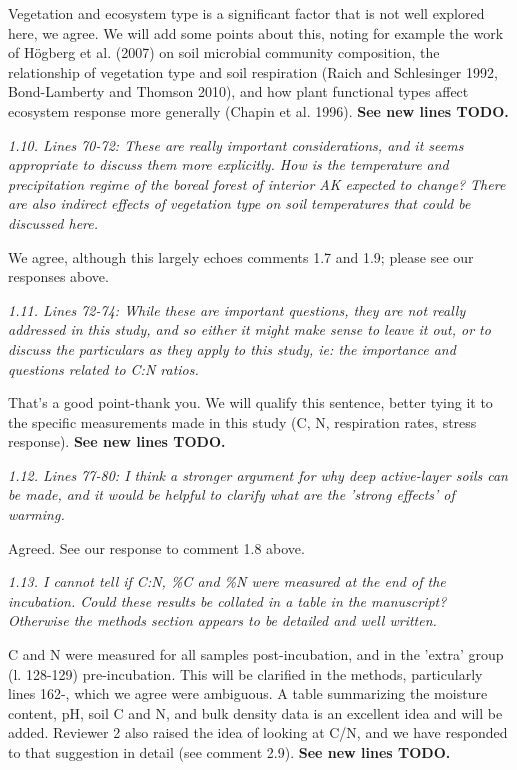 \documentclass[11pt, oneside]{article}
\begin{document}
Vegetation and ecosystem type is a significant factor that is not well explored here, we agree. We will add some points about this, noting for example the work of Högberg et al. (2007) on soil microbial community composition, the relationship of vegetation type and soil respiration (Raich and Schlesinger 1992, Bond-Lamberty and Thomson 2010), and how plant functional types affect ecosystem response more generally (Chapin et al. 1996). {\bf See new lines TODO.}

\medskip
{\it 1.10. Lines 70-72: These are really important considerations, and it seems appropriate to discuss them more explicitly. How is the temperature and precipitation regime of the boreal forest of interior AK expected to change? There are also indirect effects of vegetation type on soil temperatures that could be discussed here. }

We agree, although this largely echoes comments 1.7 and 1.9; please see our responses above.

\medskip
{\it 1.11. Lines 72-74: While these are important questions, they are not really addressed in this study, and so either it might make sense to leave it out, or to discuss the particulars as they apply to this study, ie: the importance and questions related to C:N ratios. }

That's a good point-thank you. We will qualify this sentence, better tying it to the specific measurements made in this study (C, N, respiration rates, stress response). {\bf See new lines TODO.}

\medskip
{\it 1.12. Lines 77-80: I think a stronger argument for why deep active-layer soils can be made, and it would be helpful to clarify what are the 'strong effects' of warming. }

Agreed. See our response to comment 1.8 above.

\medskip
{\it 1.13. I cannot tell if C:N, \%C and \%N were measured at the end of the incubation. Could these results be collated in a table in the manuscript? Otherwise the methods section appears to be detailed and well written. }

C and N were measured for all samples post-incubation, and in the 'extra' group (l. 128-129) pre-incubation. This will be clarified in the methods, particularly lines 162-, which we agree were ambiguous. A table summarizing the moisture content, pH, soil C and N, and bulk density data is an excellent idea and will be added. Reviewer 2 also raised the idea of looking at C/N, and we have responded to that suggestion in detail (see comment 2.9). {\bf See new lines TODO.}
\end{document}
